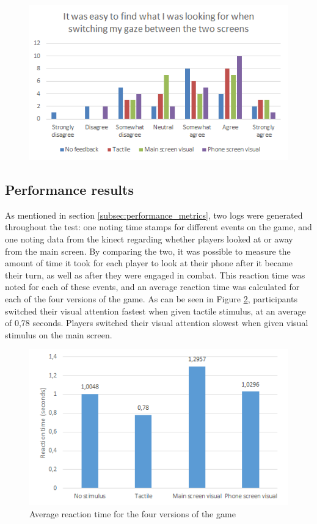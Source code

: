 \begin{figure}[h!]
	\centering
	\includegraphics[scale=1]{figures/questionnaire_f.png}
	\caption{}\label{fig:questionnaire_f}
\end{figure}

\subsection{Performance results}
As mentioned in section \ref{subsec:performance_metrics}, two logs were generated throughout the test: one noting time stamps for different events on the game, and one noting data from the kinect regarding whether players looked at or away from the main screen. By comparing the two, it was possible to measure the amount of time it took for each player to look at their phone after it became their turn, as well as after they were engaged in combat. This reaction time was noted for each of these events, and an average reaction time was calculated for each of the four versions of the game. As can be seen in Figure \ref{fig:reaction_time}, participants switched their visual attention fastest when given tactile stimulus, at an average of 0,78 seconds. Players switched their visual attention slowest when given visual stimulus on the main screen.

\begin{figure}[h!]
	\centering
	\includegraphics[scale=1]{figures/reaction_time.png}
	\caption{Average reaction time for the four versions of the game}\label{fig:reaction_time}
\end{figure}

